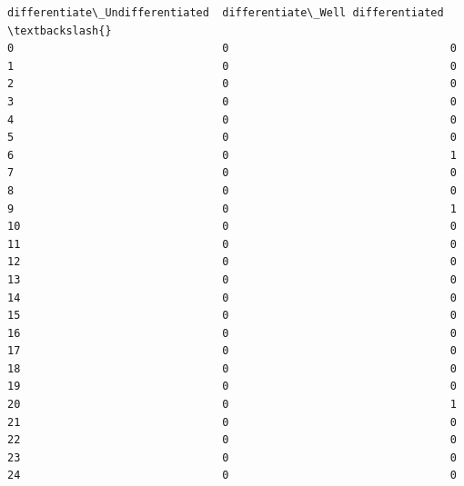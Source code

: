 \documentclass[11pt]{article}
\begin{document}
\begin{tcolorbox}[breakable, size=fbox, boxrule=.5pt, pad at break*=1mm, opacityfill=0]
\begin{Verbatim}[commandchars=\\\{\}]
    differentiate\_Undifferentiated  differentiate\_Well differentiated  \textbackslash{}
0                                0                                  0
1                                0                                  0
2                                0                                  0
3                                0                                  0
4                                0                                  0
5                                0                                  0
6                                0                                  1
7                                0                                  0
8                                0                                  0
9                                0                                  1
10                               0                                  0
11                               0                                  0
12                               0                                  0
13                               0                                  0
14                               0                                  0
15                               0                                  0
16                               0                                  0
17                               0                                  0
18                               0                                  0
19                               0                                  0
20                               0                                  1
21                               0                                  0
22                               0                                  0
23                               0                                  0
24                               0                                  0


\end{Verbatim}
\end{tcolorbox}
\end{document}
